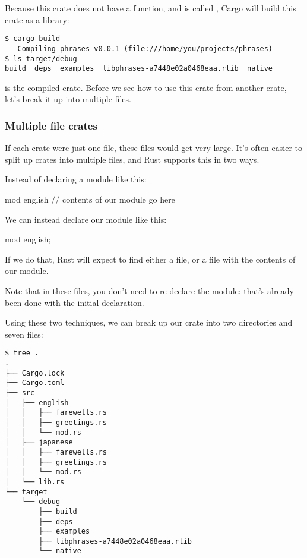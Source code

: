 \blank

Because this crate does not have a  function, and is called , Cargo will build this crate as a library:

\begin{verbatim}
$ cargo build
   Compiling phrases v0.0.1 (file:///home/you/projects/phrases)
$ ls target/debug
build  deps  examples  libphrases-a7448e02a0468eaa.rlib  native
\end{verbatim}

 is the compiled crate. Before we see how to use this crate from another crate, let's break it up into 
multiple files.

\subsubsection*{Multiple file crates}

If each crate were just one file, these files would get very large. It's often easier to split up crates into multiple files, 
and Rust supports this in two ways.

\blank

Instead of declaring a module like this:

\begin{rustc}
mod english {
    // contents of our module go here
}
\end{rustc}

We can instead declare our module like this:

\begin{rustc}
mod english;
\end{rustc}

If we do that, Rust will expect to find either a  file, or a  file with the contents of our module.

\blank

Note that in these files, you don't need to re-declare the module: that's already been done with the initial  declaration.

\blank

Using these two techniques, we can break up our crate into two directories and seven files:

\begin{verbatim}
$ tree .
.
├── Cargo.lock
├── Cargo.toml
├── src
│   ├── english
│   │   ├── farewells.rs
│   │   ├── greetings.rs
│   │   └── mod.rs
│   ├── japanese
│   │   ├── farewells.rs
│   │   ├── greetings.rs
│   │   └── mod.rs
│   └── lib.rs
└── target
    └── debug
        ├── build
        ├── deps
        ├── examples
        ├── libphrases-a7448e02a0468eaa.rlib
        └── native
\end{verbatim}

